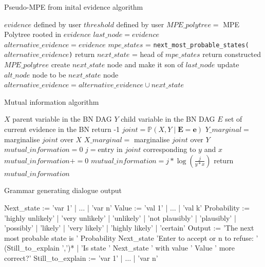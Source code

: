 \begin{algorithm}[htp!]
	\caption{Pseudo-MPE from inital evidence algorithm}
	\label{alg:pseudo-mpe-initial-evidence}
	\begin{algorithmic}[1]
		\State $evidence$ defined by user
		\State $threshold$ defined by user
		\State $MPE\_polytree = $ MPE Polytree rooted in $evidence$
		\State $last\_node = evidence$
		\State $alternative\_evidence = evidence$ 
			\State $mpe\_states$ = \texttt{next\_most\_probable\_states($alternative\_evidence$)}
				\State return
			\Else
				\State $next\_state$ = head of $mpe\_states$ 
					\State return constructed $MPE\_polytree$
				\EndIf
				\State create $next\_state$ node and make it son of $last\_node$
				\State update $alt\_node$ node to be $next\_state$ node
				\State $alternative\_evidence = alternative\_evidence \cup next\_state$
			\EndIf
		\EndWhile
	\end{algorithmic}
\end{algorithm}

\begin{algorithm}[htp!]
	\caption{Mutual information algorithm}
	\label{alg:mutual-information}
	\begin{algorithmic}[1]
		\State $X$ parent variable in the BN DAG
		\State $Y$ child variable in the BN DAG
		\State $E$ set of current evidence in the BN
			\State return -1
		\EndIf
		\State $joint=\mathbb{P}(X,Y \mid \boldsymbol{E}=\boldsymbol{e})$
		\State $Y\_marginal=$ marginalise $joint$ over $X$
		\State $X\_marginal=$ marginalise $joint$ over $Y$
		\State $mutual\_information = 0$
				\State $j=$entry in $joint$ corresponding to $y$ and $x$
					\State $mutual\_information += 0$
				\Else
					\State $mutual\_information = j * \log( \frac{j}{y * x } )$
				\EndIf
			\EndFor
		\EndFor
		\State return $mutual\_information$
	\end{algorithmic}
\end{algorithm}

\begin{algorithm}[htp!]
	\caption{Grammar generating dialogue output}
	\label{alg:nl-dialogue}
	\begin{algorithmic}[1]
		\State Next\_state := 'var 1' | $\ldots$ |  'var n'
		\State Value := 'val 1' | $\ldots$ |  'val k'
		\State Probability := 'highly unlikely' | 'very unlikely' | 'unlikely' | 'not plausibly' | 'plausibly' | 'possibly' | 'likely' | 'very likely' | 'highly likely' | 'certain'
		\State Output := 'The next most probable state is ' Probability Next\_state 'Enter to accept or n to refuse: ' (Still\_to\_explain ',')* | 'Is state ' Next\_state ' with value ' Value ' more correct?' 
		\State Still\_to\_explain := 'var 1' | $\ldots$ |  'var n'
	\end{algorithmic}
\end{algorithm}

